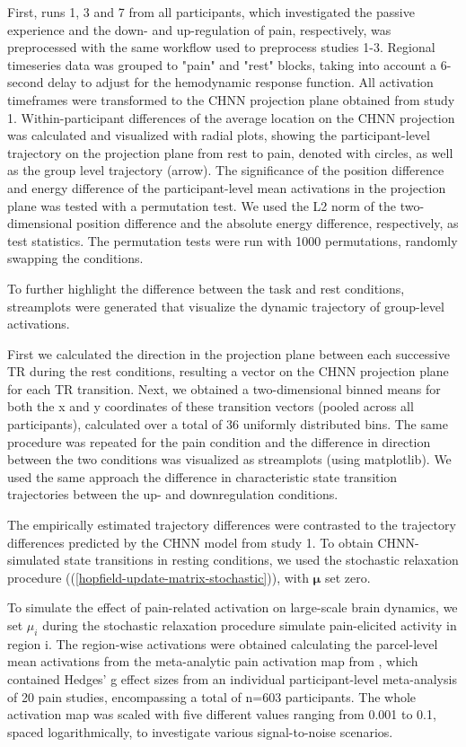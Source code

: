 \documentclass{article}
\begin{document}
First, runs 1, 3 and 7 from all participants, which investigated the passive experience and the down- and up-regulation of pain, respectively, was preprocessed with the same workflow used to preprocess studies 1-3. Regional timeseries data was grouped to "pain" and "rest" blocks, taking into account a 6-second delay to adjust for the hemodynamic response function. All activation timeframes were transformed to the CHNN projection plane obtained from study 1. Within-participant differences of the average location on the CHNN projection was calculated and visualized with radial plots, showing the participant-level trajectory on the projection plane from rest to pain, denoted with circles, as well as the group level trajectory (arrow). The significance of the position difference and energy difference of the participant-level mean activations in the projection plane was tested with a permutation test. We used the L2 norm of the two-dimensional position difference and the absolute energy difference, respectively, as test statistics. The permutation tests were run with 1000 permutations, randomly swapping the conditions.

To further highlight the difference between the task and rest conditions, streamplots were generated that visualize the dynamic trajectory of group-level activations.

First we calculated the direction in the projection plane between each successive TR during the rest conditions, resulting a vector on the CHNN projection plane for each TR transition.
Next, we obtained a two-dimensional binned means for both the x and y coordinates of these transition vectors (pooled across all participants), calculated over a total of 36 uniformly distributed bins.
The same procedure was repeated for the pain condition and the difference in direction between the two conditions was visualized as streamplots (using matplotlib).
We used the same approach the difference in characteristic state transition trajectories between the up- and downregulation conditions.

The empirically estimated trajectory differences were contrasted to the trajectory differences predicted by the CHNN model from study 1.
To obtain CHNN-simulated state transitions in resting conditions, we used the stochastic relaxation procedure ((\ref{hopfield-update-matrix-stochastic})), with $\mathbf{\mu}$ set zero.

To simulate the effect of pain-related activation on large-scale brain dynamics, we set $\mu_i$ during the stochastic relaxation procedure simulate pain-elicited activity in region i. The region-wise activations were obtained calculating the parcel-level mean activations from the meta-analytic pain activation map from \citep{zunhammer2021meta}, which contained Hedges' g effect sizes from an individual participant-level meta-analysis of 20 pain studies, encompassing a total of n=603 participants. The whole activation map was scaled with five different values ranging from 0.001 to 0.1, spaced logarithmically, to investigate various signal-to-noise scenarios.
\end{document}
